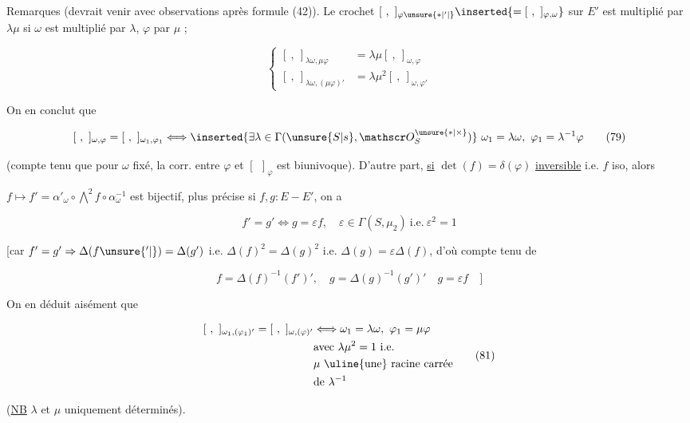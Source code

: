 Remarques (devrait venir avec observations après formule (42)). Le crochet $[\ ,\ ]_{\varphi\unsure{*|'|{}}}\inserted{=[\ ,\ ]_{\varphi,\omega}}$ sur $E'$ est multiplié par $\lambda\mu$ si $\omega$ est multiplié par $\lambda$, $\varphi$ par $\mu$ ; 

\[
\left\{\begin{aligned}
[\ ,\ ]_{\lambda\omega,\mu\varphi}&=\lambda\mu[\ ,\ ]_{\omega,\varphi}\\
[\ ,\ ]_{\lambda\omega,(\mu\varphi)'}&=\lambda\mu^2[\ ,\ ]_{\omega,\varphi'}
\end{aligned}\right. \tag*{(78)}
\]

On en conclut que

\[
[\ ,\ ]_{\omega,\varphi}=[\ ,\ ]_{\omega_1,\varphi_1}
\Longleftrightarrow\inserted{\exists\lambda\in\Gamma(\unsure{S|s},\mathscr O_S^{\unsure{*|\times}})}
\ \omega_1=\lambda\omega,\ \varphi_1=\lambda^{-1}\varphi \tag*{(79)}
\]

 (compte tenu que pour $\omega$ fixé, la corr. entre $\varphi$ et $[\ \ ]_\varphi$ est biunivoque). D'autre part, \uline{si} $\det(f)=\delta(\varphi)$ \uline{inversible} i.e. $f$ iso,  alors

$f\longmapsto f'=\alpha'_\omega\circ\bigwedge^2 f\circ\alpha_\omega^{-1}$ est  bijectif,   plus précise si $f,g:E\mathbin{-}E'$, on a

\[
f'=g'\Longleftrightarrow g=\varepsilon f,\quad
\varepsilon\in\Gamma(S,\mu_2)\ \text{i.e.}\ \varepsilon^2=1 \tag*{(80)}
\]

[car $f'=g'\Rightarrow\Delta(f\unsure{'|{}})=\Delta(g')$ i.e. $\Delta(f)^2=\Delta(g)^2$ i.e. $\Delta(g)=\varepsilon\Delta(f)$, d'où compte tenu de

\[
f=\Delta(f)^{-1}(f')',\quad g=\Delta(g)^{-1}(g')'\quad g=\varepsilon f\quad]
\]

On en déduit aisément que

\[
\begin{aligned}
[\ ,\ ]_{\omega_1,(\varphi_1)'}=[\ ,\ ]_{\omega,(\varphi)'}&\Longleftrightarrow\omega_1=\lambda\omega,\ \varphi_1=\mu\varphi\\
&\text{avec }\lambda\mu^2=1\ \text{i.e.}\\
&\mu\ \text{\uline{une} racine carrée}\\
&\text{de }\lambda^{-1}
\end{aligned} \tag*{(81)}
\]

(\uline{NB} $\lambda$ et $\mu$ uniquement déterminés).

